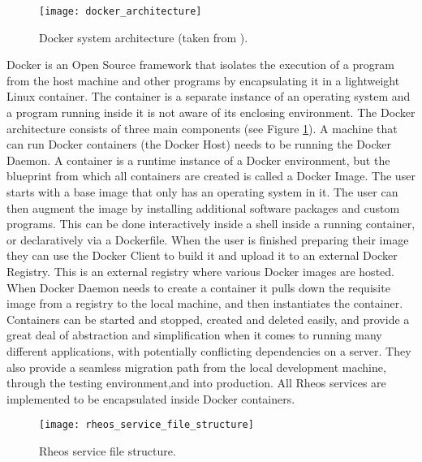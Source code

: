 \begin{figure}[H]
    \texttt{[image: docker\_architecture]}
    \centering
    \caption {Docker system architecture (taken from \autocite{dockerdoc}).}
    \label{fig:docker_architecture}
\end{figure}
\newpage
Docker is an Open Source framework that isolates the execution of a program from the host machine and other programs by encapsulating it in a lightweight Linux container. The container is a separate instance of an operating system and a program running inside it is not aware of its enclosing environment. The Docker architecture consists of three main components (see Figure \ref{fig:docker_architecture}). A machine that can run Docker containers (the Docker Host)
needs to be running the Docker Daemon. A container is a runtime instance of a Docker environment, but the blueprint from which all containers are created is called a Docker Image. The user starts with a base image that only has an operating system in it. The user can then augment the image by installing additional software packages and custom programs. This can be done interactively inside a shell inside a running container, or declaratively via a Dockerfile. When the user is finished preparing their image they can use the Docker Client to build it and upload it to an external Docker Registry. This is an external registry where various Docker images are hosted. When Docker Daemon needs to create a container it pulls down the requisite image from a registry to the local machine, and then instantiates the container. Containers can be started and stopped, created and deleted easily, and provide a great deal of abstraction and simplification when it comes to running many different applications, with potentially conflicting dependencies on a server. They also provide a seamless migration path from the local development machine, through the testing environment,and into production. All Rheos services are implemented to be encapsulated inside Docker containers.

\begin{figure}[H]
    \texttt{[image: rheos\_service\_file\_structure]}
    \centering
    \caption {Rheos service file structure.}
    \label{fig:rheos_service_file_structure}
\end{figure}

